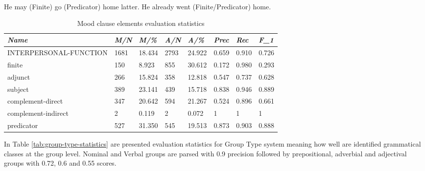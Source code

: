 \begin{exe}
	\ex \label{ex:non-conflated-finite} He may (Finite) go (Predicator) home latter.
	\ex \label{ex:conflated-finite} He already went (Finite/Predicator) home. 
\end{exe}

\begin{table}[H]
	\centering
	\begin{tabulary}{\linewidth}{|L|l|l|l|l|l|l|l|}
		\hline
		\textit{Name}          & \textit{M/N} & \textit{M/\%} & \textit{A/N} & \textit{A/\%} & \textit{Prec} & \textit{Rec} & \textit{F_{1}} \\ \hline
		INTERPERSONAL-FUNCTION & 1681       & 18.434          & 2793        & 24.922           & 0.659              & 0.910           & 0.726       \\ \hline
		finite                 & 150        & 8.923           & 855         & 30.612           & 0.172              & 0.980           & 0.293       \\ \hline
		adjunct                & 266        & 15.824          & 358         & 12.818           & 0.547              & 0.737           & 0.628       \\ \hline
		subject                & 389        & 23.141          & 439         & 15.718           & 0.838              & 0.946           & 0.889       \\ \hline
		complement-direct      & 347        & 20.642          & 594         & 21.267           & 0.524              & 0.896           & 0.661       \\ \hline
		complement-indirect    & 2          & 0.119           & 2           & 0.072            & 1              & 1           & 1      \\ \hline
		predicator             & 527        & 31.350          & 545         & 19.513           & 0.873              & 0.903           & 0.888       \\ \hline
	\end{tabulary}
	\caption{Mood clause elements evaluation statistics}
	\label{tab:interpersonal-statistics}
\end{table}

In Table \ref{tab:group-type-statistics} are presented evaluation statistics for Group Type system meaning how well are identified grammatical classes at the group level. Nominal and Verbal groups are parsed with 0.9 precision followed by prepositional, adverbial and adjectival groups with 0.72, 0.6 and 0.55 scores.


